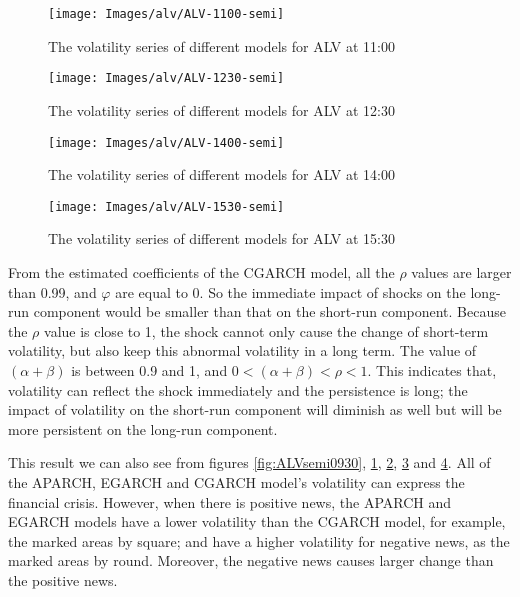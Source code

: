\begin{figure}[!htbp]
	\centering
	\texttt{[image: Images/alv/ALV-1100-semi]}
	\caption[The volatility series of different models for ALV at 11:00]{The volatility series of different models for ALV at 11:00}
	\label{fig:ALVsemi1100}
\end{figure}

\begin{figure}[!htbp]
	\centering
	\texttt{[image: Images/alv/ALV-1230-semi]}
	\caption[The volatility series of different models for ALV at 12:30]{The volatility series of different models for ALV at 12:30}
	\label{fig:ALVsemi1230}
\end{figure}

\begin{figure}[!htbp]
	\centering
	\texttt{[image: Images/alv/ALV-1400-semi]}
	\caption[The volatility series of different models for ALV at 14:00]{The volatility series of different models for ALV at 14:00}
	\label{fig:ALVsemi1400}
\end{figure}

\begin{figure}[!htbp]
	\centering
	\texttt{[image: Images/alv/ALV-1530-semi]}
	\caption[The volatility series of different models for ALV at 15:30]{The volatility series of different models for ALV at 15:30}
	\label{fig:ALVsemi1530}
\end{figure}


From the estimated coefficients of the CGARCH model, all the $\rho$ values are larger than 0.99, and $\varphi$ are equal to 0. So the immediate impact of shocks on the long-run component would be smaller than that on the short-run component. Because the $\rho$ value is close to 1, the shock cannot only cause the change of short-term volatility, but also keep this abnormal volatility in a long term. The value of $(\alpha + \beta)$ is between 0.9 and 1, and $0 < (\alpha + \beta) < \rho <1$. This indicates that, volatility can reflect the shock immediately and the persistence is long; the impact of volatility on the short-run component will diminish as well but will be more persistent on the long-run component.

This result we can also see from figures \ref{fig:ALVsemi0930}, \ref{fig:ALVsemi1100}, \ref{fig:ALVsemi1230}, \ref{fig:ALVsemi1400} and \ref{fig:ALVsemi1530}. All of the APARCH, EGARCH and CGARCH model's volatility can express the financial crisis. However, when there is positive news, the APARCH and EGARCH models have a lower volatility than the CGARCH model, for example, the marked areas by square; and have a higher volatility for negative news, as the marked areas by round. Moreover, the negative news causes larger change than the positive news.

